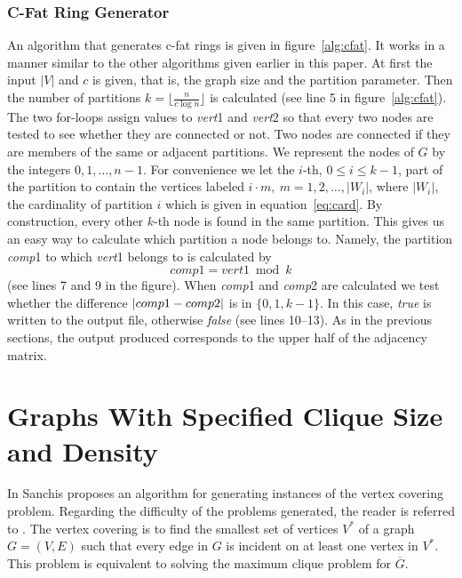 \subsubsection{C-Fat Ring Generator}
\label{sss:cfat}
An algorithm that generates c-fat rings is given in
figure~\ref{alg:cfat}. It works in a manner similar to the
other algorithms given earlier in this paper. At first the input $|V|$
and $c$ is given, that is, the graph size and the partition
parameter. Then the number of partitions $k =
\lfloor \frac{n}{c\log n} \rfloor$ is calculated (see line 5 in
figure~\ref{alg:cfat}). The two for-loops
assign values to {\em vert\/}1 and {\em vert\/}2 so that every two
nodes are tested to see whether they are connected or not. Two nodes
are connected if they are members of the same or adjacent partitions.
We represent the nodes of $G$ by the integers $0,1,\ldots,n-1$. For convenience
we let the $i$-th, $0 \leq i \leq k-1$, part of the partition to contain the
vertices labeled $i\cdot m,\ m = 1,2,\ldots,|W_{i}|$, where $|W_{i}|$, the
cardinality of partition $i$ which is given in equation~\ref{eq:card}. By
construction, every other $k$-th node is found in the same partition. This gives
us an easy way to calculate which partition a node belongs to. Namely, the
partition {\em comp\/}1 to which {\em vert\/}1 belongs to is calculated by
\begin{displaymath}
comp1 = vert1 \bmod k
\end{displaymath}
(see lines 7 and 9 in the figure). When {\em comp\/}1 and {\em
comp\/}2 are calculated we test whether the difference
$|comp\/1 - comp\/2|$ is in $\{0,1,k-1\}$. In this case, {\em true} is written
to the output file, otherwise {\em false} (see lines 10--13).
As in the previous sections, the output produced corresponds to the upper half
of the adjacency matrix.

\section{Graphs With Specified Clique Size and Density}

In \cite{San1,San2} Sanchis proposes an algorithm for generating
instances of the vertex covering problem. Regarding the difficulty of the
problems generated, the reader is referred to \cite{San1}. The vertex covering
is to find the smallest set of vertices $V^{*}$ of a
graph $G=(V,E)$ such that every edge in $G$ is incident on at least
one vertex in $V^{*}$. This problem is equivalent to solving the maximum
clique problem for $\overline{G}$.

